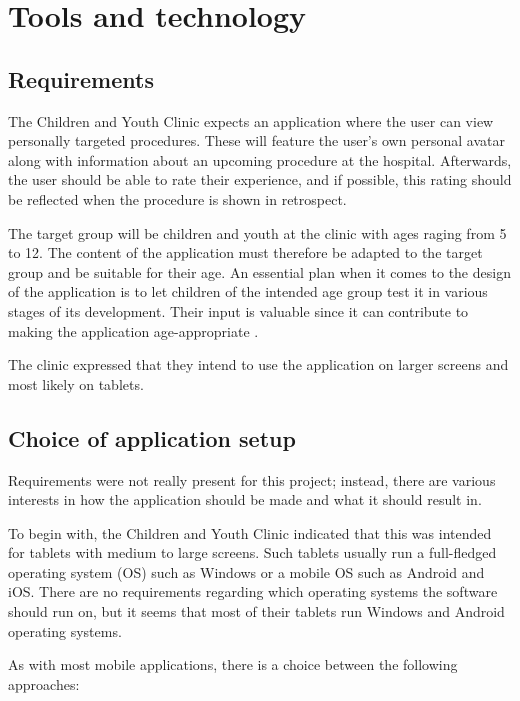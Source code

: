 \chapter{Tools and technology}
\label{ch:tools}

\section{Requirements}

The Children and Youth Clinic expects an application where the user can view personally targeted procedures. These will feature the user's own personal avatar along with information about an upcoming procedure at the hospital. Afterwards, the user should be able to rate their experience, and if possible, this rating should be reflected when the procedure is shown in retrospect.

The target group will be children and youth at the clinic with ages raging from 5 to 12. The content of the application must therefore be adapted to the target group and be suitable for their age. An essential plan when it comes to the design of the application is to let children of the intended age group test it in various stages of its development. Their input is valuable since it can contribute to making the application age-appropriate \parencite{stalberg2016}.

The clinic expressed that they intend to use the application on larger screens and most likely on tablets.

\section{Choice of application setup}

Requirements were not really present for this project; instead, there are various interests in how the application should be made and what it should result in.

To begin with, the Children and Youth Clinic indicated that this was intended for tablets with medium to large screens. Such tablets usually run a full-fledged operating system (OS) such as Windows or a mobile OS such as Android and iOS. There are no requirements regarding which operating systems the software should run on, but it seems that most of their tablets run Windows and Android operating systems.

As with most mobile applications, there is a choice between the following approaches:

